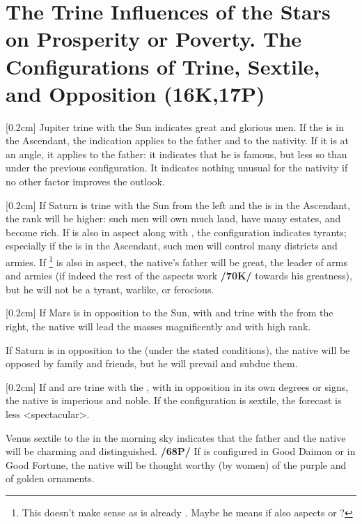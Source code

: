 \section{The Trine Influences of the Stars on Prosperity or Poverty. The Configurations of Trine, Sextile, and Opposition (16K,17P)}

\marginnote{\Jupiter \Trine \Sun}[0.2cm]
Jupiter trine with the Sun indicates great and glorious men. If the \Sun\xspace is in the Ascendant, the
indication applies to the father and to the nativity. If it is at an angle, it applies to the father: it indicates that he is famous, but less so than under the previous configuration. It indicates nothing unusual for the nativity if no other factor improves the outlook. 

\marginnote{\Saturn \Trine \Sun}[0.2cm]
If Saturn is trine with the Sun from the left and the \Sun\xspace is in the Ascendant, the rank will be higher: such men will own much land, have many estates, and become rich. If \Mars\xspace is also in aspect along with \Jupiter, the configuration indicates tyrants; especially if the \Sun\xspace is in the Ascendant, such men will control many districts and armies. If \Saturn\xspace
\footnote{This doesn't make sense as \Saturn\xspace is already \Trine\Sun. Maybe he means if \Saturn\xspace also aspects \Mars\xspace or \Jupiter?}
is also in aspect, the native’s father will be great, the leader of arms and armies (if indeed the rest of the aspects work \textbf{/70K/} towards his greatness), but he will not be a tyrant, warlike, or ferocious.

\marginnote{\Mars \Opposition \Sun}[0.2cm]
If Mars is in opposition to the Sun, with \Jupiter\xspace and \Saturn\xspace trine with the \Sun\xspace from the right, the native will lead the masses magnificently and with high rank. 

If Saturn is in opposition to the \Sun\xspace (under the stated conditions), the native will be opposed by family and friends, but he will prevail and subdue
them. 

\marginnote{\Saturn\xspace \Mars \Trine \Sun}[0.2cm]
If \Saturn\xspace and \Mars\xspace are trine with the \Sun, with \Jupiter\xspace in opposition in its own degrees or signs, the native is imperious and noble. If the configuration is sextile, the forecast is less <spectacular>.


Venus \marginnote{\Venus \Sextile \Sun} sextile to the \Sun\xspace in the morning sky indicates that the father and the native will be charming and distinguished. \textbf{/68P/} If \Venus\xspace is configured in Good Daimon or in Good Fortune, the native will be thought worthy (by women) of the purple and of golden ornaments.


